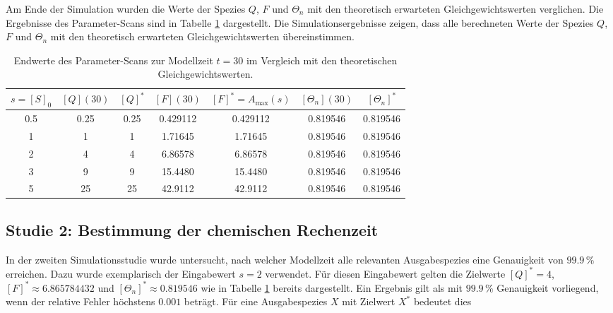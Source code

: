 Am Ende der Simulation wurden die Werte der Spezies \(Q\), \(F\) und
\(\Theta_n\) mit den theoretisch erwarteten Gleichgewichtswerten
verglichen. Die Ergebnisse des Parameter-Scans sind in Tabelle
\ref{tab:studie1_parameter_scan} dargestellt. Die Simulationsergebnisse zeigen, dass alle berechneten Werte der Spezies \(Q\), \(F\) und \(\Theta_n\) mit den theoretisch erwarteten Gleichgewichtswerten übereinstimmen.

\begin{table}[h]
    \centering
    \small
    \begin{tabular}{c|c|c|c|c|c|c}
        \(s=[S]_0\) &
        \([Q](30)\) &
        \([Q]^*\) &
        \([F](30)\) &
        \([F]^*=A_{\max}(s)\) &
        \([\Theta_n](30)\) &
        \([\Theta_n]^*\) \\
        \hline
        0.5 & 0.25 & 0.25 & 0.429112 & 0.429112 & 0.819546 & 0.819546 \\
        1   & 1    & 1    & 1.71645  & 1.71645  & 0.819546 & 0.819546 \\
        2   & 4    & 4    & 6.86578  & 6.86578  & 0.819546 & 0.819546 \\
        3   & 9    & 9    & 15.4480  & 15.4480  & 0.819546 & 0.819546 \\
        5   & 25   & 25   & 42.9112  & 42.9112  & 0.819546 & 0.819546 \\
    \end{tabular}
    \caption{Endwerte des Parameter-Scans zur Modellzeit \(t=30\) im Vergleich mit den theoretischen Gleichgewichtswerten.}
    \label{tab:studie1_parameter_scan}
\end{table}



\subsection{Studie 2: Bestimmung der chemischen Rechenzeit}

In der zweiten Simulationsstudie wurde untersucht, nach welcher Modellzeit
alle relevanten Ausgabespezies eine Genauigkeit von \(99.9\,\%\) erreichen.
Dazu wurde exemplarisch der Eingabewert $s=2$ verwendet. Für diesen Eingabewert gelten die Zielwerte $[Q]^*=4$, $[F]^* \approx 6.865784432$ und $[\Theta_n]^* \approx 0.819546$ wie in Tabelle \ref{tab:studie1_parameter_scan} bereits dargestellt. Ein Ergebnis gilt als mit \(99.9\,\%\) Genauigkeit vorliegend, wenn der relative Fehler höchstens \(0.001\) beträgt. Für eine Ausgabespezies \(X\) mit Zielwert \(X^*\) bedeutet dies

